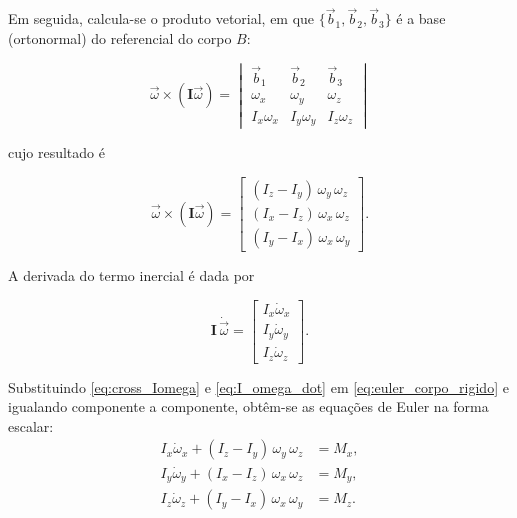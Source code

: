 Em seguida, calcula-se o produto vetorial, em que $\{\vec{b}_1,\vec{b}_2,\vec{b}_3\}$ é a base (ortonormal) do referencial do corpo $B$:

\begin{equation}
\vec{\omega} \times (\mathbf{I}\vec{\omega})
=
\begin{vmatrix}
\vec{b}_1 & \vec{b}_2 & \vec{b}_3 \\
\omega_x & \omega_y & \omega_z \\
I_x\omega_x & I_y\omega_y & I_z\omega_z
\end{vmatrix}
\end{equation}

cujo resultado é

\begin{equation}
\vec{\omega} \times (\mathbf{I}\vec{\omega})
=
\begin{bmatrix}
(I_z - I_y)\,\omega_y\,\omega_z \\
(I_x - I_z)\,\omega_x\,\omega_z \\
(I_y - I_x)\,\omega_x\,\omega_y
\end{bmatrix}.
\label{eq:cross_Iomega}
\end{equation}


A derivada do termo inercial é dada por

\begin{equation}
\mathbf{I}\,\dot{\vec{\omega}}
=
\begin{bmatrix}
I_x \dot{\omega}_x \\
I_y \dot{\omega}_y \\
I_z \dot{\omega}_z
\end{bmatrix}.
\label{eq:I_omega_dot}
\end{equation}

Substituindo \eqref{eq:cross_Iomega} e \eqref{eq:I_omega_dot} em \eqref{eq:euler_corpo_rigido} e igualando componente a componente, obtêm-se as equações de Euler na forma escalar:
\begin{equation}
\begin{aligned}
I_x \dot{\omega}_x + (I_z - I_y)\,\omega_y\,\omega_z &= M_x, \\
I_y \dot{\omega}_y + (I_x - I_z)\,\omega_x\,\omega_z &= M_y, \\
I_z \dot{\omega}_z + (I_y - I_x)\,\omega_x\,\omega_y &= M_z.
\end{aligned}
\end{equation}

